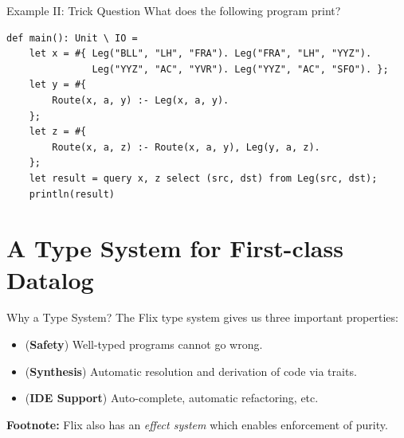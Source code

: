 \begin{frame}[fragile]{Example II: Trick Question}
What does the following program print?

\begin{lstlisting}[language=flix, xleftmargin=0.8cm]
def main(): Unit \ IO = 
    let x = #{ Leg("BLL", "LH", "FRA"). Leg("FRA", "LH", "YYZ"). 
               Leg("YYZ", "AC", "YVR"). Leg("YYZ", "AC", "SFO"). };
    let y = #{ 
        Route(x, a, y) :- Leg(x, a, y).
    };
    let z = #{ 
        Route(x, a, z) :- Route(x, a, y), Leg(y, a, z).
    };
    let result = query x, z select (src, dst) from Leg(src, dst);
    println(result)
\end{lstlisting}

\end{frame}

\section{A Type System for First-class Datalog}

\begin{frame}{Why a Type System?}
The Flix type system gives us three important properties:

\begin{itemize}
    \item (\textbf{Safety}) Well-typed programs cannot go wrong.
    \item (\textbf{Synthesis}) Automatic resolution and derivation of code via
    traits. 
    \item (\textbf{IDE Support}) Auto-complete, automatic refactoring, etc.
\end{itemize}

\medskip

\small
\textbf{Footnote:} Flix also has an \emph{effect system} which enables enforcement of purity.
\end{frame}

